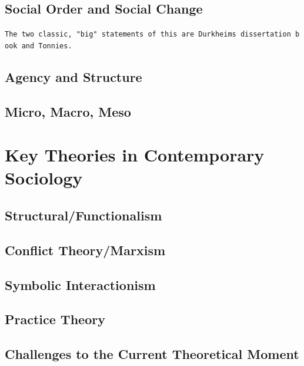 \documentclass[
  letterpaper,
  DIV=11,
  numbers=noendperiod,
  oneside]{scrartcl}
\begin{document}
\subsection{Social Order and Social
Change}\label{social-order-and-social-change}

\texttt{The\ two\ classic,\ "big"\ statements\ of\ this\ are\ Durkheim\textquotesingle{}s\ dissertation\ book\ and\ Tonnies.}

\subsection{Agency and Structure}\label{agency-and-structure}

\subsection{Micro, Macro, Meso}\label{micro-macro-meso}

\section{Key Theories in Contemporary
Sociology}\label{key-theories-in-contemporary-sociology}

\subsection{Structural/Functionalism}\label{structuralfunctionalism}

\subsection{Conflict Theory/Marxism}\label{conflict-theorymarxism}

\subsection{Symbolic Interactionism}\label{symbolic-interactionism}

\subsection{Practice Theory}\label{practice-theory}

\subsection{Challenges to the Current Theoretical
Moment}\label{challenges-to-the-current-theoretical-moment}
\end{document}
